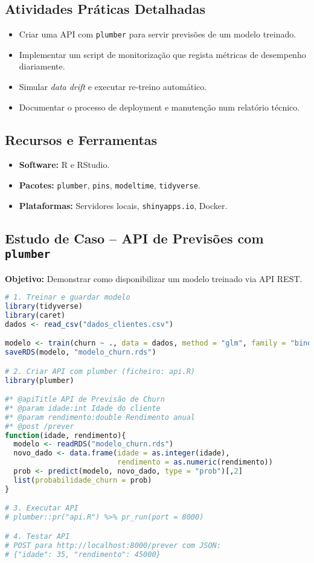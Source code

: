 \subsection{\textcolor{subsectionblue}{Atividades Práticas Detalhadas}}
\begin{itemize}
  \item Criar uma API com \texttt{plumber} para servir previsões de um modelo treinado.
  \item Implementar um script de monitorização que regista métricas de desempenho diariamente.
  \item Simular \textit{data drift} e executar re-treino automático.
  \item Documentar o processo de deployment e manutenção num relatório técnico.
\end{itemize}

\subsection{\textcolor{subsectionblue}{Recursos e Ferramentas}}
\begin{itemize}
  \item \textbf{Software:} R e RStudio.
  \item \textbf{Pacotes:} \texttt{plumber}, \texttt{pins}, \texttt{modeltime}, \texttt{tidyverse}.
  \item \textbf{Plataformas:} Servidores locais, \texttt{shinyapps.io}, Docker.
\end{itemize}

\subsection{\textcolor{subsectionblue}{Estudo de Caso – API de Previsões com \texttt{plumber}}}
\textbf{Objetivo:} Demonstrar como disponibilizar um modelo treinado via API REST.

\begin{lstlisting}[language=R]
# 1. Treinar e guardar modelo
library(tidyverse)
library(caret)
dados <- read_csv("dados_clientes.csv")

modelo <- train(churn ~ ., data = dados, method = "glm", family = "binomial")
saveRDS(modelo, "modelo_churn.rds")

# 2. Criar API com plumber (ficheiro: api.R)
library(plumber)

#* @apiTitle API de Previsão de Churn
#* @param idade:int Idade do cliente
#* @param rendimento:double Rendimento anual
#* @post /prever
function(idade, rendimento){
  modelo <- readRDS("modelo_churn.rds")
  novo_dado <- data.frame(idade = as.integer(idade),
                          rendimento = as.numeric(rendimento))
  prob <- predict(modelo, novo_dado, type = "prob")[,2]
  list(probabilidade_churn = prob)
}

# 3. Executar API
# plumber::pr("api.R") %>% pr_run(port = 8000)

# 4. Testar API
# POST para http://localhost:8000/prever com JSON:
# {"idade": 35, "rendimento": 45000}
\end{lstlisting}

